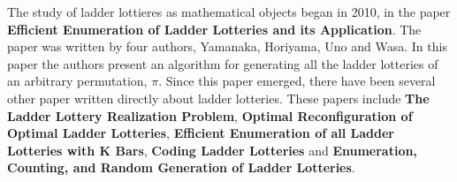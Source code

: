     The study of ladder lottieres as mathematical objects began in 2010, in  the paper
    \textbf{Efficient Enumeration of Ladder Lotteries and its Application}. The paper was 
    written by four authors, Yamanaka, Horiyama, Uno and Wasa. In this paper the 
    authors present an algorithm for generating all the ladder lotteries of an 
    arbitrary permutation, $\pi$. Since this paper emerged, there have been 
    several other paper written directly about ladder lotteries. 
    These papers include \textbf{The Ladder Lottery Realization Problem},
    \textbf{Optimal Reconfiguration of Optimal Ladder Lotteries}, 
    \textbf{Efficient Enumeration of all Ladder Lotteries with K Bars},
    \textbf{Coding Ladder Lotteries} and
    \textbf{Enumeration, Counting, and Random Generation of Ladder Lotteries}.


\pagebreak



\par


\par 



